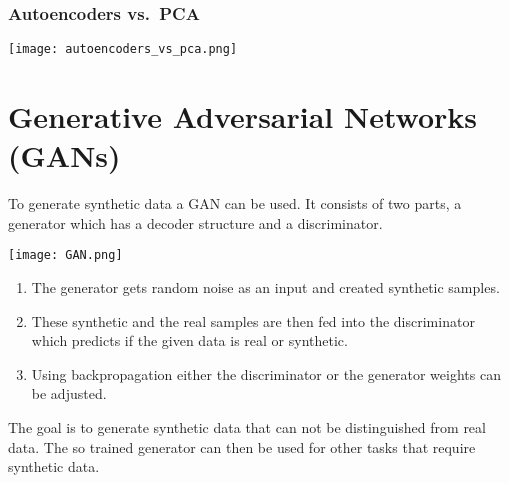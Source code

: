 \subsubsection{Autoencoders vs.\ PCA}
\begin{center}
    \texttt{[image: autoencoders\_vs\_pca.png]}
\end{center}

\section{Generative Adversarial Networks (GANs)}

To generate synthetic data a GAN can be used. It consists of two parts, a generator which has a decoder structure and a discriminator. 
\begin{center}
    \texttt{[image: GAN.png]}
\end{center}
\begin{enumerate}
    \item The generator gets random noise as an input and created synthetic samples.
    \item These synthetic and the real samples are then fed into the discriminator which predicts if the given data is real or synthetic.
    \item Using backpropagation either the discriminator or the generator weights can be adjusted.
\end{enumerate}
The goal is to generate synthetic data that can not be distinguished from real data. The so trained generator can then be used for other tasks that require synthetic data.